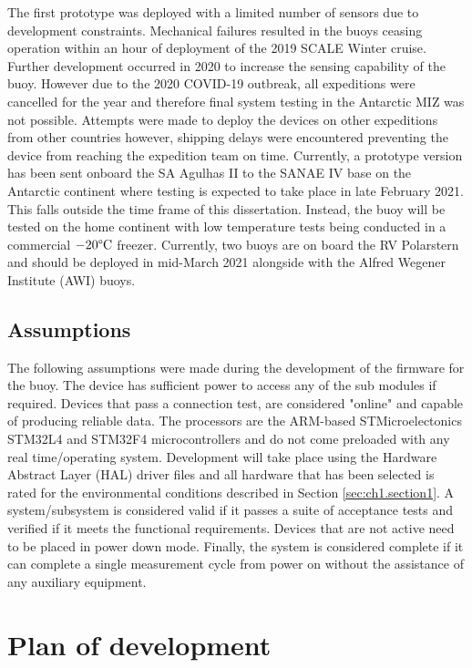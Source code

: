 The first prototype was deployed with a limited number of sensors due to development constraints. Mechanical failures resulted in the buoys ceasing operation within an hour of deployment of the 2019 SCALE Winter cruise. Further development occurred in 2020 to increase the sensing capability of the buoy. However due to the 2020 COVID-19 outbreak, all expeditions were cancelled for the year and therefore final system testing in the Antarctic MIZ was not possible. Attempts were made to deploy the devices on other expeditions from other countries however, shipping delays were encountered preventing the device from reaching the expedition team on time. Currently, a prototype version has been sent onboard the SA Agulhas II to the SANAE IV base on the Antarctic continent where testing is expected to take place in late February 2021. This falls outside the time frame of this dissertation. Instead, the buoy will be tested on the home  continent with low temperature tests being conducted in a commercial $-20\degree \text{C}$ freezer. Currently, two buoys are on board the RV Polarstern and should be deployed in mid-March 2021 alongside with the Alfred Wegener Institute (AWI) buoys.

\subsection{Assumptions}

The following assumptions were made during the development of the firmware for the buoy. The device has sufficient power to access any of the sub modules if required. Devices that pass a connection test, are considered "online" and capable of producing reliable data. The processors are the ARM-based STMicroelectonics  STM32L4 and STM32F4 microcontrollers and do not come preloaded with any real time/operating system. Development will take place using the Hardware Abstract Layer (HAL) driver files and all hardware that has been selected is rated for the environmental conditions described in Section \ref{sec:ch1.section1}. A system/subsystem is considered valid if it passes a suite of acceptance tests and verified if it meets the functional requirements. Devices that are not active need to be placed in power down mode. Finally, the system is considered complete if it can complete a single measurement cycle from power on without the assistance of any auxiliary equipment.

\section{Plan of development}
\label{sec:ch1.section3}

